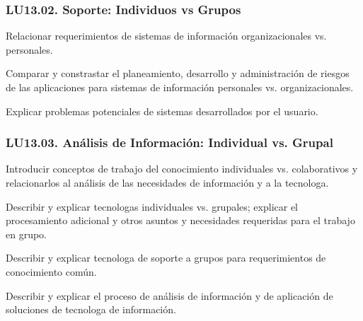 \subsubsection{LU13.02. Soporte: Individuos vs Grupos}\label{sec:LU13.02}
\begin{LearningUnit}
\begin{LUGoal}
\item Relacionar requerimientos de sistemas de información organizacionales vs. personales.
\end{LUGoal}

\begin{LUObjective}
\item Comparar y constrastar el planeamiento, desarrollo y administración de riesgos de las aplicaciones para sistemas de información personales vs. organizacionales.
\item Explicar problemas potenciales de sistemas desarrollados por el usuario.
\end{LUObjective}
\end{LearningUnit}

\subsubsection{LU13.03. Análisis de Información: Individual vs. Grupal}\label{sec:LU13.03}
\begin{LearningUnit}
\begin{LUGoal}
\item Introducir conceptos de trabajo del conocimiento individuales vs. colaborativos y relacionarlos al análisis de las necesidades de información y a la tecnolog­a.
\end{LUGoal}

\begin{LUObjective}
\item Describir y explicar tecnolog­as individuales vs. grupales; explicar el procesamiento adicional y otros asuntos y necesidades requeridas para el trabajo en grupo.
\item Describir y explicar tecnolog­a de soporte a grupos para requerimientos de conocimiento común.
\item Describir y explicar el proceso de análisis de información y de aplicación de soluciones de tecnolog­a de información.
\end{LUObjective}
\end{LearningUnit}

